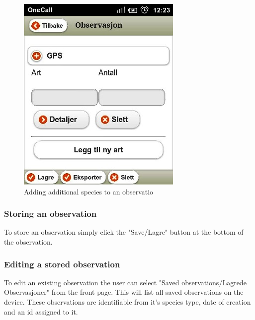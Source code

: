 \begin{figure}[h!]
\centering
 \includegraphics[scale=0.9]{appendix/pic/nyart.jpg}
 \caption{Adding additional species to an observatio}
 \end{figure}

\subsubsection{Storing an observation}
To store an observation simply click the "Save/Lagre" button at the bottom of the observation.


\pagebreak

\subsubsection{Editing a stored observation}
To edit an existing observation the user can select "Saved observations/Lagrede Observasjoner" from the front page.
This will list all saved observations on the device.
These observations are identifiable from it's species type, date of creation and an id assigned to it.

